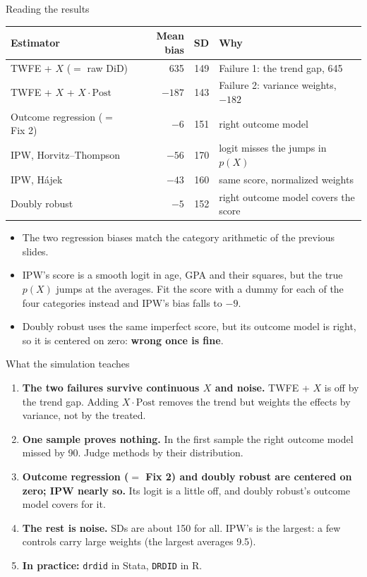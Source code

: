 \documentclass[
  11pt,
  ignorenonframetext,
  aspectratio=169,
]{beamer}
\providecommand{\tightlist}{%
  \setlength{\itemsep}{0pt}\setlength{\parskip}{0pt}}
\begin{document}
\begin{frame}{Reading the results}
\protect{}\label{reading-the-results}
\begin{center}\small
\begin{tabular}{lrrl}
\toprule
Estimator & Mean bias & SD & Why \\
\midrule
TWFE + $X$ ($=$ raw DiD) & 635 & 149 & Failure 1: the trend gap, 645 \\
TWFE + $X$ + $X \cdot \text{Post}$ & $-187$ & 143 & Failure 2: variance weights, $-182$ \\
Outcome regression ($=$ Fix 2) & $-6$ & 151 & right outcome model \\
IPW, Horvitz--Thompson & $-56$ & 170 & logit misses the jumps in $p(X)$ \\
IPW, Hájek & $-43$ & 160 & same score, normalized weights \\
Doubly robust & $-5$ & 152 & right outcome model covers the score \\
\bottomrule
\end{tabular}
\end{center}

\begin{itemize}
\tightlist
\item
  The two regression biases match the category arithmetic of the
  previous slides.
\item
  IPW's score is a smooth logit in age, GPA and their squares, but the
  true \(p(X)\) jumps at the averages. Fit the score with a dummy for
  each of the four categories instead and IPW's bias falls to \(-9\).
\item
  Doubly robust uses the same imperfect score, but its outcome model is
  right, so it is centered on zero: \textbf{wrong once is fine}.
\end{itemize}
\end{frame}

\begin{frame}[fragile]{What the simulation teaches}
\protect{}\label{what-the-simulation-teaches}
\begin{enumerate}
\tightlist
\item
  \textbf{The two failures survive continuous \(X\) and noise.} TWFE +
  \(X\) is off by the trend gap. Adding \(X \cdot \text{Post}\) removes
  the trend but weights the effects by variance, not by the treated.
\item
  \textbf{One sample proves nothing.} In the first sample the right
  outcome model missed by 90. Judge methods by their distribution.
\item
  \textbf{Outcome regression (\(=\) Fix 2) and doubly robust are
  centered on zero; IPW nearly so.} Its logit is a little off, and
  doubly robust's outcome model covers for it.
\item
  \textbf{The rest is noise.} SDs are about 150 for all. IPW's is the
  largest: a few controls carry large weights (the largest averages
  9.5).
\item
  \textbf{In practice:} \texttt{drdid} in Stata, \texttt{DRDID} in R.
\end{enumerate}
\end{frame}
\end{document}
